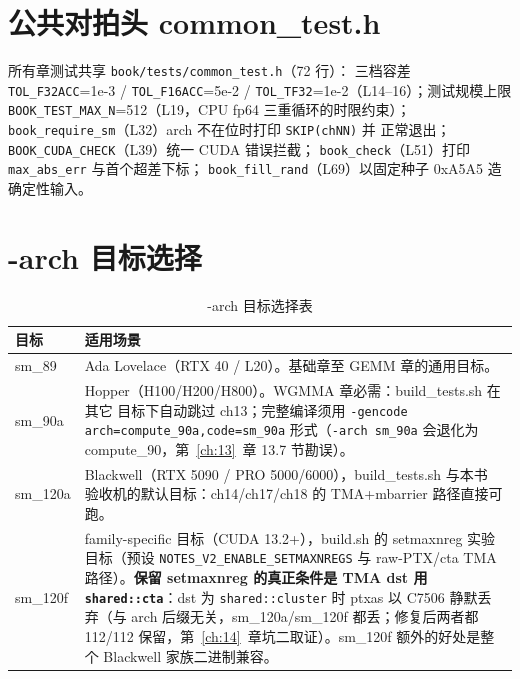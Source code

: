 \section{公共对拍头 common\_test.h}

所有章测试共享 \texttt{book/\allowbreak{}tests/\allowbreak{}common\_\allowbreak{}test.\allowbreak{}h}（72 行）：
三档容差 \texttt{TOL\_F32ACC}=1e-3 / \texttt{TOL\_F16ACC}=5e-2 /
\texttt{TOL\_TF32}=1e-2（L14--16）；测试规模上限
\texttt{BOOK\_\allowbreak{}TEST\_\allowbreak{}MAX\_\allowbreak{}N}=512（L19，CPU fp64 三重循环的时限约束）；
\texttt{book\_\allowbreak{}require\_\allowbreak{}sm}（L32）arch 不在位时打印 \texttt{SKIP(chNN)} 并
正常退出；\texttt{BOOK\_\allowbreak{}CUDA\_\allowbreak{}CHECK}（L39）统一 CUDA 错误拦截；
\texttt{book\_check}（L51）打印 \texttt{max\_abs\_err} 与首个超差下标；
\texttt{book\_\allowbreak{}fill\_\allowbreak{}rand}（L69）以固定种子 0xA5A5 造确定性输入。

\section{-arch 目标选择}

\begin{table}[htbp]
\centering\small
\caption{-arch 目标选择表}\label{tab:appC-arch}
\begin{tabular}{lp{8.6cm}}
\toprule
目标 & 适用场景 \\
\midrule
sm\_89 & Ada Lovelace（RTX 40 / L20）。基础章至 GEMM 章的通用目标。 \\
sm\_90a & Hopper（H100/H200/H800）。WGMMA 章必需：build\_tests.sh 在其它
  目标下自动跳过 ch13；完整编译须用 \texttt{-gencode
  arch=\allowbreak{}compute\_\allowbreak{}90a,\allowbreak{}code=\allowbreak{}sm\_\allowbreak{}90a} 形式（\texttt{-arch sm\_90a} 会退化为
  compute\_90，第~\ref{ch:13}~章 13.7 节勘误）。 \\
sm\_120a & Blackwell（RTX 5090 / PRO 5000/6000），build\_tests.sh 与本书
  验收机的默认目标：ch14/ch17/ch18 的 TMA+mbarrier 路径直接可跑。 \\
sm\_120f & family-specific 目标（CUDA 13.2+），build.sh 的 setmaxnreg
  实验目标（预设 \texttt{NOTES\_\allowbreak{}V2\_\allowbreak{}ENABLE\_\allowbreak{}SETMAXNREGS} 与
  raw-PTX/cta TMA 路径）。\textbf{保留 setmaxnreg 的真正条件是 TMA dst 用
  \texttt{shared::cta}}：dst 为 \texttt{shared::cluster} 时 ptxas 以 C7506
  静默丢弃（与 arch 后缀无关，sm\_120a/sm\_120f 都丢；修复后两者都 112/112
  保留，第~\ref{ch:14}~章坑二取证）。sm\_120f 额外的好处是整个 Blackwell
  家族二进制兼容。 \\
\bottomrule
\end{tabular}
\end{table}

